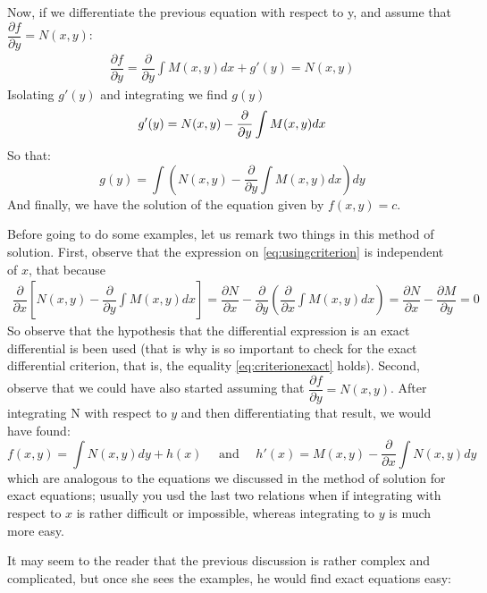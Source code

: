\documentclass[10pt,a4paper]{article}
\begin{document}
Now, if we differentiate the previous equation with respect to y, and assume that $ \dfrac{\partial f}{\partial y} = N(x,y) $:
\begin{align*}
\dfrac{\partial f}{\partial y} = \dfrac{\partial}{\partial y} \int M(x,y)dx + g'(y) = N(x,y)
\end{align*}
Isolating $g'(y)$ and integrating we find $g(y)$
\begin{equation} \label{eq:usingcriterion}
g'(y) = N(x,y) - \dfrac{\partial}{\partial y }\int M(x,y)dx \\
\end{equation}
So that:
\begin{equation*}
g(y) = \int (N(x,y) - \dfrac{\partial}{\partial y }\int M(x,y)dx)dy
\end{equation*}
And finally, we have the solution  of the equation given by $f(x,y)=c$.

Before going to do some examples, let us remark two things in this method of solution.
First, observe that the expression on \eqref{eq:usingcriterion} is independent of $x$, that because
\begin{align*}
\dfrac{\partial}{\partial x} \left[ N(x,y) - \dfrac{\partial}{\partial y} \int M(x,y) dx \right] = \dfrac{\partial N}{\partial x} - \dfrac{\partial}{\partial y} \left(  \dfrac{\partial}{\partial x} \int M(x,y) dx \right) = \dfrac{\partial N}{\partial x} - \dfrac{\partial M}{\partial y} = 0
\end{align*} 
So observe that the hypothesis that the differential expression is an exact differential is been used (that is why is so important to check for the exact differential criterion, that is, the equality \eqref{eq:criterionexact} holds).
Second, observe that we could have also started assuming that $ \dfrac{\partial f}{\partial y } = N(x,y) $. After integrating N with respect to $y$ and then differentiating that result, we would have found:
\begin{equation*}
f(x,y) = \int N(x,y)dy + h(x) \quad \text{ and } \quad  h'(x) = M(x,y) - \dfrac{\partial}{\partial x} \int N(x,y)dy
\end{equation*}
which are analogous to the equations we discussed in the method of solution for exact equations; usually you usd the last two relations when if integrating with respect to $x$ is rather difficult or impossible, whereas integrating to $y$ is much more easy.

It may seem to the reader that the previous discussion is rather complex and complicated, but once  she sees the examples, he would find exact equations easy:
\end{document}
